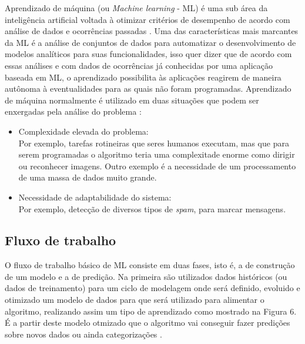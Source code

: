 Aprendizado de máquina (ou \textit{Machine learning} - ML) é uma sub área da inteligência artificial voltada à otimizar critérios de desempenho de acordo com análise de dados e ocorrências passadas \cite{alpaydin2010}. Uma das características mais marcantes da ML é a análise de conjuntos de dados para automatizar o desenvolvimento de modelos analíticos para suas funcionalidades, isso quer dizer que de acordo com essas análises e com dados de ocorrências já conhecidas por uma aplicação baseada em ML, o aprendizado possibilita às aplicações reagirem de maneira autônoma à eventualidades para as quais não foram programadas. Aprendizado de máquina normalmente é utilizado em duas situações que podem ser enxergadas pela análise do problema \cite{shalev2014}:

\begin{itemize}
    \item Complexidade elevada do problema: \\ Por exemplo, tarefas rotineiras que seres humanos executam, mas que para serem programadas o algoritmo teria uma complexitade enorme como dirigir ou reconhecer imagens. Outro exemplo é a necessidade de um processamento de uma massa de dados muito grande.
    \item Necessidade de adaptabilidade do sistema: \\ Por exemplo, detecção de diversos tipos de \textit{spam}, para marcar mensagens. \\
\end{itemize}

\subsection{Fluxo de trabalho}
    O fluxo de trabalho básico de ML consiste em duas fases, isto é, a de construção de um modelo e a de predição. Na primeira são utilizados dados históricos (ou dados de treinamento) para um ciclo de modelagem onde será definido, evoluido e otimizado um modelo de dados para que será utilizado para alimentar o algoritmo, realizando assim um tipo de aprendizado como mostrado na Figura 6. É a partir deste modelo otmizado que o algoritmo vai conseguir fazer predições sobre novos dados ou ainda categorizações \cite{brink2015}.

